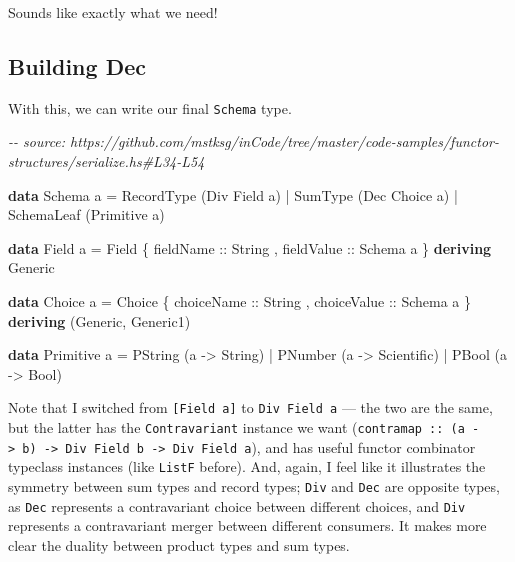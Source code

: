 \documentclass[]{article}
\newenvironment{Shaded}{}{}
\newcommand{\CommentTok}[1]{\textcolor[rgb]{0.38,0.63,0.69}{\textit{#1}}}
\newcommand{\DataTypeTok}[1]{\textcolor[rgb]{0.56,0.13,0.00}{#1}}
\newcommand{\KeywordTok}[1]{\textcolor[rgb]{0.00,0.44,0.13}{\textbf{#1}}}
\newcommand{\NormalTok}[1]{#1}
\newcommand{\OperatorTok}[1]{\textcolor[rgb]{0.40,0.40,0.40}{#1}}
\newcommand{\OtherTok}[1]{\textcolor[rgb]{0.00,0.44,0.13}{#1}}
\begin{document}
Sounds like exactly what we need!

\hypertarget{building-dec}{%
\subsection{Building Dec}\label{building-dec}}

With this, we can write our final \texttt{Schema} type.

\begin{Shaded}
\begin{Highlighting}[]
\CommentTok{{-}{-} source: https://github.com/mstksg/inCode/tree/master/code{-}samples/functor{-}structures/serialize.hs\#L34{-}L54}

\KeywordTok{data} \DataTypeTok{Schema}\NormalTok{ a }\OtherTok{=}
      \DataTypeTok{RecordType}\NormalTok{  (}\DataTypeTok{Div} \DataTypeTok{Field}\NormalTok{ a)}
    \OperatorTok{|} \DataTypeTok{SumType}\NormalTok{     (}\DataTypeTok{Dec} \DataTypeTok{Choice}\NormalTok{ a)}
    \OperatorTok{|} \DataTypeTok{SchemaLeaf}\NormalTok{  (}\DataTypeTok{Primitive}\NormalTok{ a)}

\KeywordTok{data} \DataTypeTok{Field}\NormalTok{ a }\OtherTok{=} \DataTypeTok{Field}
\NormalTok{    \{}\OtherTok{ fieldName  ::} \DataTypeTok{String}
\NormalTok{    ,}\OtherTok{ fieldValue ::} \DataTypeTok{Schema}\NormalTok{ a}
\NormalTok{    \}}
  \KeywordTok{deriving} \DataTypeTok{Generic}

\KeywordTok{data} \DataTypeTok{Choice}\NormalTok{ a }\OtherTok{=} \DataTypeTok{Choice}
\NormalTok{    \{}\OtherTok{ choiceName  ::} \DataTypeTok{String}
\NormalTok{    ,}\OtherTok{ choiceValue ::} \DataTypeTok{Schema}\NormalTok{ a}
\NormalTok{    \}}
  \KeywordTok{deriving}\NormalTok{ (}\DataTypeTok{Generic}\NormalTok{, }\DataTypeTok{Generic1}\NormalTok{)}

\KeywordTok{data} \DataTypeTok{Primitive}\NormalTok{ a }\OtherTok{=}
      \DataTypeTok{PString}\NormalTok{ (a }\OtherTok{{-}>} \DataTypeTok{String}\NormalTok{)}
    \OperatorTok{|} \DataTypeTok{PNumber}\NormalTok{ (a }\OtherTok{{-}>} \DataTypeTok{Scientific}\NormalTok{)}
    \OperatorTok{|} \DataTypeTok{PBool}\NormalTok{   (a }\OtherTok{{-}>} \DataTypeTok{Bool}\NormalTok{)}
\end{Highlighting}
\end{Shaded}

Note that I switched from \texttt{{[}Field\ a{]}} to \texttt{Div\ Field\ a} ---
the two are the same, but the latter has the \texttt{Contravariant} instance we
want
(\texttt{contramap\ ::\ (a\ -\textgreater{}\ b)\ -\textgreater{}\ Div\ Field\ b\ -\textgreater{}\ Div\ Field\ a}),
and has useful functor combinator typeclass instances (like \texttt{ListF}
before). And, again, I feel like it illustrates the symmetry between sum types
and record types; \texttt{Div} and \texttt{Dec} are opposite types, as
\texttt{Dec} represents a contravariant choice between different choices, and
\texttt{Div} represents a contravariant merger between different consumers. It
makes more clear the duality between product types and sum types.
\end{document}
